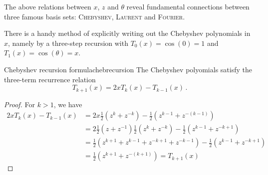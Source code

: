 \documentclass[12pt, a4paper]{article}
\begin{document}
  The above relations between $x$, $z$ and $\theta$ reveal fundamental connections between three famous basis sets: \textsc{Chebyshev}, \textsc{Laurent} and \textsc{Fourier}.

  There is a handy method of explicitly writing out the Chebyshev polynomials in $x$, namely by a three-step recursion with $T_0(x) = \cos(0) = 1$ and $T_1(x) = \cos(\theta) = x$.

  \begin{theorem}{Chebyshev recursion formula}{chebrecursion}
    The Chebyshev polyomials satisfy the three-term recurrence relation $$T_{k+1}(x) = 2x T_k(x) - T_{k-1}(x) \,.$$
  \end{theorem}
  \begin{proof}
    For $k > 1$, we have
    \begin{align*}
      2x T_k(x) - T_{k-1}(x) & = 2x \frac{1}{2} (z^k + z^{-k}) - \frac{1}{2} (z^{k-1} + z^{-(k-1)})                       \\
                             & = 2 \frac{1}{2}(z + z^{-1}) \frac{1}{2}(z^k + z^{-k}) - \frac{1}{2} (z^{k-1} + z^{-k+1})   \\
                             & = \frac{1}{2} (z^{k+1} + z^{k-1} + z^{-k+1} + z^{-k-1}) - \frac{1}{2} (z^{k-1} + z^{-k+1}) \\
                             & = \frac{1}{2} (z^{k+1} + z^{-(k+1)}) = T_{k+1}(x)
    \end{align*}
  \end{proof}
\end{document}
